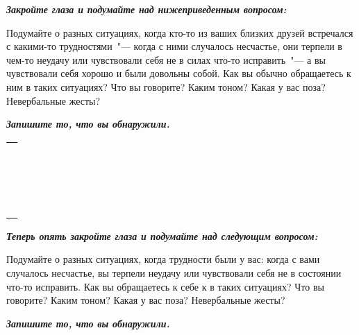 \newpage
{} \label{Ex:How_Do_I_Treat_a_Friend?}
\begin{itemize}
	\itemWritingHand \textbf{\textit{Закройте глаза и подумайте над нижеприведенным вопросом: }}
	
	Подумайте о разных ситуациях, когда кто-то из ваших близких друзей встречался с какими-то трудностями~"--- когда с ними случалось несчастье, они терпели в чем-то неудачу или чувствовали себя не в силах что-то исправить~"--- а вы чувствовали себя хорошо и были довольны собой. Как вы обычно обращаетесь к ним в таких ситуациях? 
	Что вы говорите? Каким тоном? Какая у вас поза? Невербальные жесты?
	
	\textbf{\textit{Запишите то, что вы обнаружили.}}
\end{itemize}

\setlength{\extrarowheight}{2mm}
\begin{tabularx}{\textwidth}{X}
	\\
	\arrayrulecolor{gray}\hline\\
	\hline\\
	\hline\\
	\hline\\
	\hline\\
	\hline\\
	\hline\\	
	\hline\\
	\hline\\
	\hline\\
	\hline\\
	\hline\\	
	\hline\\
	\hline\\
	\hline\\
	\hline\\	
	\hline\\
	\hline\\	
	\hline\\
\end{tabularx}
\setlength{\extrarowheight}{0mm}

\begin{itemize}
	\itemWritingHand \textbf{\textit{Теперь опять закройте глаза и подумайте над следующим вопросом:}}
	
	Подумайте о разных ситуациях, когда трудности были у вас: когда с вами случалось несчастье, вы терпели неудачу или чувствовали себя не в состоянии что-то исправить. Как вы обращаетесь к себе к в таких ситуациях? Что вы говорите? Каким тоном? Какая у вас поза? Невербальные жесты?
	
	\textbf{\textit{Запишите то, что вы обнаружили.}}
\end{itemize}

